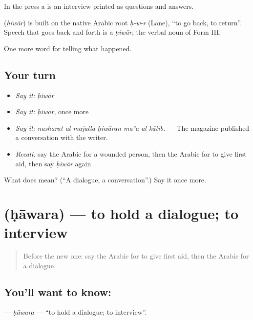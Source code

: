 In the press a  is an interview printed as questions and answers.

\begin{cousinweb}
\textbf{} (\emph{ḥiwār}) is built on the native Arabic root \emph{ḥ-w-r} (Lane), \textquotedblleft{}to go back, to return\textquotedblright{}. Speech that goes back and forth is a \emph{ḥiwār}, the verbal noun of Form III.
\end{cousinweb}

\begin{grammarlens}[title={What you've built}]
One more word for telling what happened.
\end{grammarlens}

\subsection*{Your turn}
\begin{itemize}
\raggedright
  \item \emph{Say it:} \emph{ḥiwār}
  \item \emph{Say it:} \emph{ḥiwār}, once more
  \item \emph{Say it:} \emph{nasharat al-majalla ḥiwāran maʿa al-kātib.} — The magazine published a conversation with the writer.
  \item \emph{Recall:} say the Arabic for a wounded person, then the Arabic for to give first aid, then say \emph{ḥiwār} again
\end{itemize}

\begin{tcolorbox}[breakable,colback=teal!4,colframe=teal!35!black,title={Before you move on}]
What does  mean? (\textquotedblleft{}A dialogue, a conversation\textquotedblright{}.) Say it once more.
\end{tcolorbox}
\section[\texorpdfstring{\ar{حاور} (ḥāwara)}{حاور (ḥāwara)}]{ (ḥāwara) — to hold a dialogue; to interview}

\label{lesson:AR-C302-hawara}



\begin{quote}
Before the new one: say the Arabic for to give first aid, then the Arabic for a dialogue.
\end{quote}

\subsection*{You'll want to know: }
\textbf{} — \emph{ḥāwara} — \textquotedblleft{}to hold a dialogue; to interview\textquotedblright{}.

